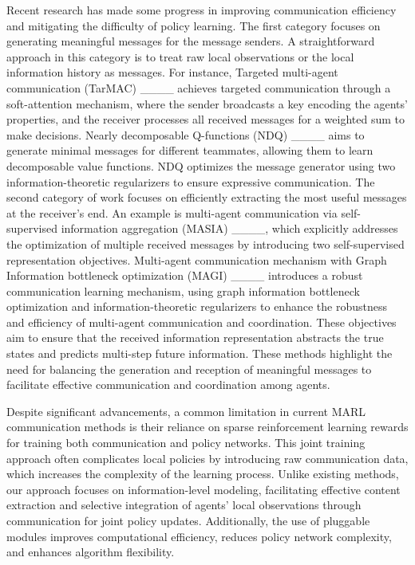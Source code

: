 Recent research has made some progress in improving communication efficiency and mitigating the difficulty of policy learning. The first category focuses on generating meaningful messages for the message senders. A straightforward approach in this category is to treat raw local observations or the local information history as messages. For instance, Targeted multi-agent communication (TarMAC) ____ achieves targeted communication through a soft-attention mechanism, where the sender broadcasts a key encoding the agents' properties, and the receiver processes all received messages for a weighted sum to make decisions. Nearly decomposable Q-functions (NDQ) ____ aims to generate minimal messages for different teammates, allowing them to learn decomposable value functions. NDQ optimizes the message generator using two information-theoretic regularizers to ensure expressive communication. The second category of work focuses on efficiently extracting the most useful messages at the receiver's end. An example is multi-agent communication via self-supervised information aggregation (MASIA) ____, which explicitly addresses the optimization of multiple received messages by introducing two self-supervised representation objectives. Multi-agent communication mechanism with Graph Information bottleneck optimization (MAGI) ____ introduces a robust communication learning mechanism, using graph information bottleneck optimization and information-theoretic regularizers to enhance the robustness and efficiency of multi-agent communication and coordination. These objectives aim to ensure that the received information representation abstracts the true states and predicts multi-step future information. These methods highlight the need for balancing the generation and reception of meaningful messages to facilitate effective communication and coordination among agents.

Despite significant advancements, a common limitation in current MARL communication methods is their reliance on sparse reinforcement learning rewards for training both communication and policy networks. This joint training approach often complicates local policies by introducing raw communication data, which increases the complexity of the learning process. Unlike existing methods, our approach focuses on information-level modeling, facilitating effective content extraction and selective integration of agents' local observations through communication for joint policy updates. Additionally, the use of pluggable modules improves computational efficiency, reduces policy network complexity, and enhances algorithm flexibility.


